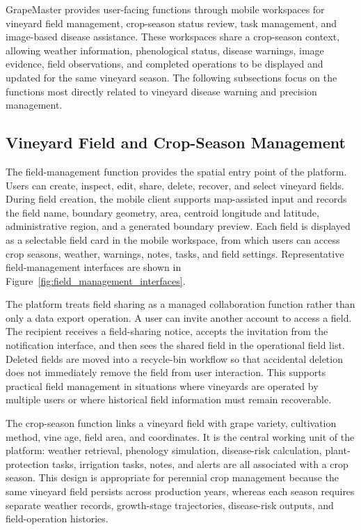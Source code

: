 \documentclass[11pt,a4paper]{article}
\begin{document}
GrapeMaster provides user-facing functions through mobile workspaces for vineyard field management, crop-season status review, task management, and image-based disease assistance. These workspaces share a crop-season context, allowing weather information, phenological status, disease warnings, image evidence, field observations, and completed operations to be displayed and updated for the same vineyard season. The following subsections focus on the functions most directly related to vineyard disease warning and precision management.

\subsection{Vineyard Field and Crop-Season Management}

The field-management function provides the spatial entry point of the platform. Users can create, inspect, edit, share, delete, recover, and select vineyard fields. During field creation, the mobile client supports map-assisted input and records the field name, boundary geometry, area, centroid longitude and latitude, administrative region, and a generated boundary preview. Each field is displayed as a selectable field card in the mobile workspace, from which users can access crop seasons, weather, warnings, notes, tasks, and field settings. Representative field-management interfaces are shown in Figure~\ref{fig:field_management_interfaces}.

The platform treats field sharing as a managed collaboration function rather than only a data export operation. A user can invite another account to access a field. The recipient receives a field-sharing notice, accepts the invitation from the notification interface, and then sees the shared field in the operational field list. Deleted fields are moved into a recycle-bin workflow so that accidental deletion does not immediately remove the field from user interaction. This supports practical field management in situations where vineyards are operated by multiple users or where historical field information must remain recoverable.

The crop-season function links a vineyard field with grape variety, cultivation method, vine age, field area, and coordinates. It is the central working unit of the platform: weather retrieval, phenology simulation, disease-risk calculation, plant-protection tasks, irrigation tasks, notes, and alerts are all associated with a crop season. This design is appropriate for perennial crop management because the same vineyard field persists across production years, whereas each season requires separate weather records, growth-stage trajectories, disease-risk outputs, and field-operation histories.
\end{document}
